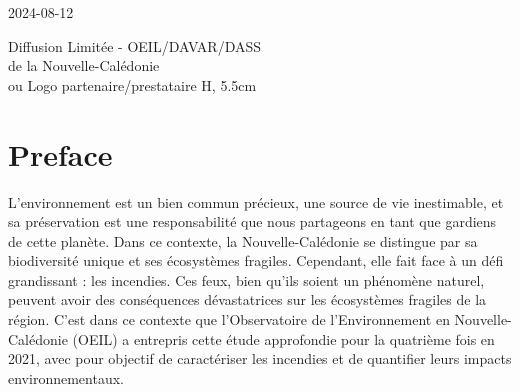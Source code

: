 \documentclass[
  11pt,
  letterpaper,
]{scrreprt}
\renewcommand*\contentsname{Table of contents}
\newcommand\contentsname{Table of contents}
\begin{document}
\begin{titlepage}
\begin{minipage}[2cm]{16cm}
\begin{adjustwidth}{0.5cm}{1cm}
            {\fontsize{12}{8}\selectfont
            \color{date_color}
            2024-08-12\\
            }

        \end{adjustwidth}
    \end{minipage}


    \begin{minipage}[1cm]{16cm}
        \begin{adjustwidth}{-0.4cm}{1cm} 
            \vspace{3.4cm}
            {\fontsize{11}{13}\selectfont
            \color{version_color}
            Diffusion Limitée - OEIL/DAVAR/DASS \\ de la Nouvelle-Calédonie\\ ou Logo partenaire/prestataire H, 5.5cm
            }
        \end{adjustwidth}
    \end{minipage}

\end{titlepage}

\renewcommand*\contentsname{Table of contents}
{
\hypersetup{linkcolor=}
\setcounter{tocdepth}{2}
\tableofcontents
}

\chapter*{Preface}\label{preface}


L'environnement est un bien commun précieux, une source de vie
inestimable, et sa préservation est une responsabilité que nous
partageons en tant que gardiens de cette planète. Dans ce contexte, la
Nouvelle-Calédonie se distingue par sa biodiversité unique et ses
écosystèmes fragiles. Cependant, elle fait face à un défi grandissant :
les incendies. Ces feux, bien qu'ils soient un phénomène naturel,
peuvent avoir des conséquences dévastatrices sur les écosystèmes
fragiles de la région. C'est dans ce contexte que l'Observatoire de
l'Environnement en Nouvelle-Calédonie (OEIL) a entrepris cette étude
approfondie pour la quatrième fois en 2021, avec pour objectif de
caractériser les incendies et de quantifier leurs impacts
environnementaux.
\end{document}
